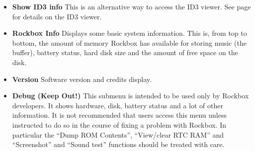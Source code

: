 \begin{itemize}
  
\item \textbf{Show ID3 info}
  This is an alternative way to access the ID3 viewer.  See page \pageref{ref:ID3viewer} for details on the ID3 viewer.
\item \textbf{Rockbox Info}
  Displays some basic system information.  This is, from top to bottom, the amount of memory Rockbox has available for storing music (the buffer), battery status, hard disk size and the amount of free space on the disk.
  
\item \textbf{Version}
  Software version and credits display.
  
\item \textbf{Debug (Keep Out!)}
  This submenu is intended to be used only by Rockbox developers. It shows hardware, disk, battery status and a lot of other information.  It is not recommended that users access this menu unless instructed to do so in the course of fixing a problem with Rockbox.  In particular the ``Dump ROM Contents'', ``View/clear RTC RAM'' and ``Screenshot'' and ``Sound test'' functions should be treated with care.
\end{itemize}

